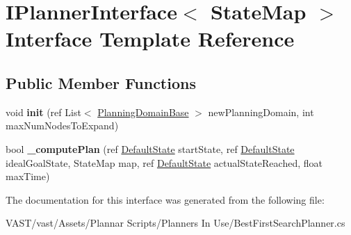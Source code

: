 \hypertarget{interface_i_planner_interface-g}{\section{I\-Planner\-Interface$<$ State\-Map $>$ Interface Template Reference}
\label{interface_i_planner_interface-g}
}
\subsection*{Public Member Functions}
\begin{DoxyCompactItemize}
\item 
\hypertarget{interface_i_planner_interface-g_af03854cd5c2754a5786f756047e70ef4}{void {\bfseries init} (ref List$<$ \hyperlink{class_planning_domain_base}{Planning\-Domain\-Base} $>$ new\-Planning\-Domain, int max\-Num\-Nodes\-To\-Expand)}\label{interface_i_planner_interface-g_af03854cd5c2754a5786f756047e70ef4}

\item 
\hypertarget{interface_i_planner_interface-g_a0e234718e6fe3da7addf43003d40693f}{bool {\bfseries \-\_\-compute\-Plan} (ref \hyperlink{class_default_state}{Default\-State} start\-State, ref \hyperlink{class_default_state}{Default\-State} ideal\-Goal\-State, State\-Map map, ref \hyperlink{class_default_state}{Default\-State} actual\-State\-Reached, float max\-Time)}\label{interface_i_planner_interface-g_a0e234718e6fe3da7addf43003d40693f}

\end{DoxyCompactItemize}


The documentation for this interface was generated from the following file\-:\begin{DoxyCompactItemize}
\item 
V\-A\-S\-T/vast/\-Assets/\-Plannar Scripts/\-Planners In Use/Best\-First\-Search\-Planner.\-cs\end{DoxyCompactItemize}
